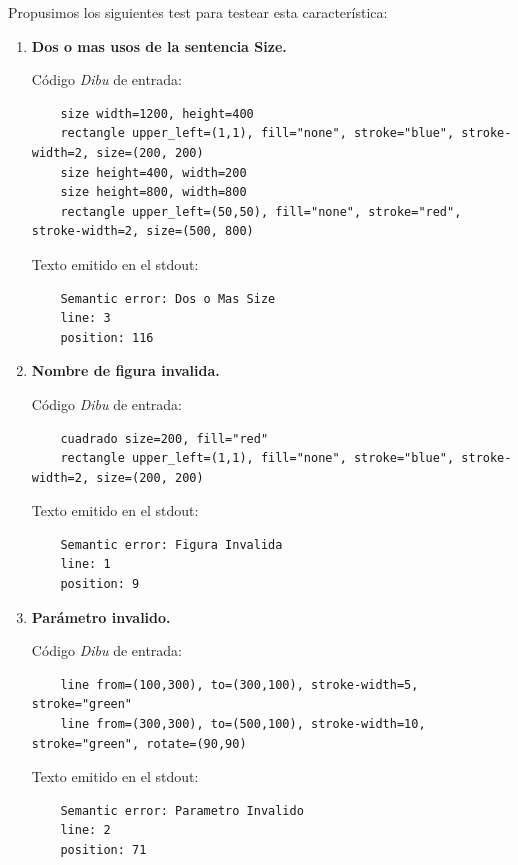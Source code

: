 Propusimos los siguientes test para testear esta característica:
\begin{enumerate}
  \item \textbf{Dos o mas usos de la sentencia Size.}

  Código \textit{Dibu} de entrada:

  \begin{lstlisting}
    size width=1200, height=400
    rectangle upper_left=(1,1), fill="none", stroke="blue", stroke-width=2, size=(200, 200)
    size height=400, width=200
    size height=800, width=800
    rectangle upper_left=(50,50), fill="none", stroke="red", stroke-width=2, size=(500, 800)
  \end{lstlisting}

  Texto emitido en el stdout:

  \begin{lstlisting}
    Semantic error: Dos o Mas Size
    line: 3
    position: 116
  \end{lstlisting}

  \item \textbf{Nombre de figura invalida.}

  Código \textit{Dibu} de entrada:

  \begin{lstlisting}
    cuadrado size=200, fill="red"
    rectangle upper_left=(1,1), fill="none", stroke="blue", stroke-width=2, size=(200, 200)
  \end{lstlisting}

  Texto emitido en el stdout:

  \begin{lstlisting}
    Semantic error: Figura Invalida
    line: 1
    position: 9
  \end{lstlisting}

  \item \textbf{Parámetro invalido.}

  Código \textit{Dibu} de entrada:

  \begin{lstlisting}
    line from=(100,300), to=(300,100), stroke-width=5, stroke="green"
    line from=(300,300), to=(500,100), stroke-width=10, stroke="green", rotate=(90,90)
  \end{lstlisting}

  Texto emitido en el stdout:

  \begin{lstlisting}
    Semantic error: Parametro Invalido
    line: 2
    position: 71
  \end{lstlisting}


\end{enumerate}
